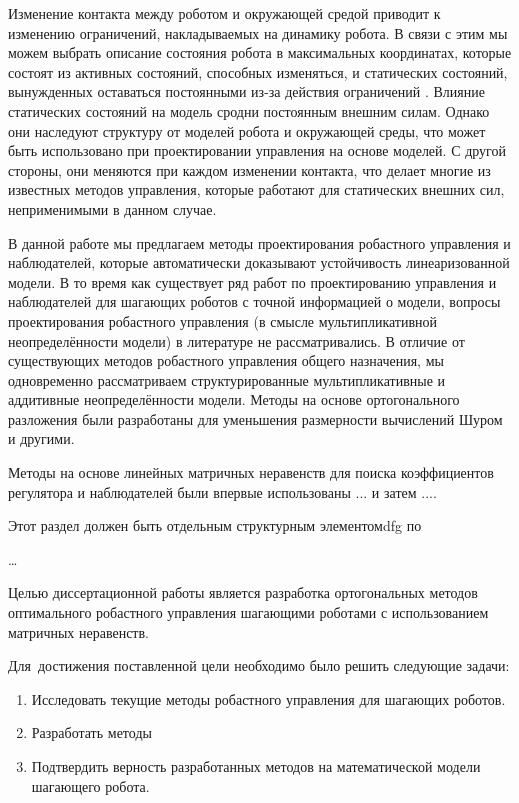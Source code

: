 Изменение контакта между роботом и окружающей средой приводит к изменению ограничений, накладываемых на динамику робота. В связи с этим мы можем выбрать описание состояния робота в максимальных координатах, которые состоят из активных состояний, способных изменяться, и статических состояний, вынужденных оставаться постоянными из-за действия ограничений \cite{SAVIN2021}. Влияние статических состояний на модель сродни постоянным внешним силам. Однако они наследуют структуру от моделей робота и окружающей среды, что может быть использовано при проектировании управления на основе моделей. С другой стороны, они меняются при каждом изменении контакта, что делает многие из известных методов управления, которые работают для статических внешних сил, неприменимыми в данном случае.

В данной работе мы предлагаем методы проектирования робастного управления и наблюдателей, которые автоматически доказывают устойчивость линеаризованной модели. В то время как существует ряд работ по проектированию управления и наблюдателей для шагающих роботов с точной информацией о модели, вопросы проектирования робастного управления (в смысле мультипликативной неопределённости модели) в литературе не рассматривались. В отличие от существующих методов робастного управления общего назначения, мы одновременно рассматриваем структурированные мультипликативные и аддитивные неопределённости модели.
Методы на основе ортогонального разложения были разработаны для уменьшения размерности вычислений Шуром и другими.

Методы на основе линейных матричных неравенств для поиска коэффициентов регулятора и наблюдателей были впервые использованы ... и затем ....


{\progress}
Этот раздел должен быть отдельным структурным элементомdfg по

{\objectsubject} \ldots

{\aimtasks} 
Целью диссертационной работы является разработка ортогональных методов оптимального робастного управления шагающими роботами с использованием матричных неравенств.

Для~достижения поставленной цели необходимо было решить следующие задачи:
\begin{enumerate}[beginpenalty=10000] %
	\item Исследовать текущие методы робастного управления для шагающих роботов.
	\item Разработать методы
	\item Подтвердить верность разработанных методов на математической модели шагающего робота.
\end{enumerate}

